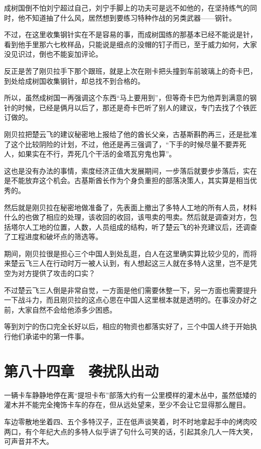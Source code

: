 成树国倒不怕刘宁超过自己，刘宁手脚上的功夫可是远不如他的，在坚持练气的同时，他不知道抽了什么风，居然想到要练习特种作战的另类武器——钢针。

不过，在这里收集钢针实在不是容易的事，而成树国练的那基本已经不能说是针，看到他手里那六七枚样品，只能说是细点的没帽的钉子而已，至于威力如何，大家没见识过，倒也不能妄加评论。

反正是苦了刚贝拉手下那个跟班，就是上次在刚卡把头撞到车前玻璃上的奇卡巴，到处给成树国收集钢针，却总找不到合格的。

所以，虽然成树国一再强调这个东西“马上要用到”，但等奇卡巴为他弄到满意的钢针的时候，已经是俩月以后了，那还是奇卡巴听了别人的建议，专门去找了个铁匠订做的。

刚贝拉把楚云飞的建议秘密地上报给了他的酋长父亲，古基斯斟酌再三，还是批准了这个比较阴险的计划，不过，他还是再三强调了，“下手的时候尽量不要弄死人，如果实在不行，弄死几个干活的金塔瓦穷鬼也算”。

这也是没有办法的事情，索度经济正值大发展期间，一步落后就要步步落后，实在是不能放弃这个机会。古基斯酋长作为个身负重担的部落决策人，其实算是相当优秀的。

然后就是刚贝拉在秘密地做准备了，先表面上撤出了多特人工地的所有人员，材料什么的也做了相应的处理，该收回的收回，该甩卖的甩卖。然后就是调查对方，包括塔尔人工地的位置，人数，人员组成的结构，听了楚云飞的补充建议后，还调查了工程进度和破坏点的筛选等。

期间，刚贝拉很是担心三个中国人到处乱逛，白人在这里确实算比较少见的，而将来楚云飞三人在行动时万一被人认到，有人想起这三人就在多特人这里，岂不是凭空为对方提供了攻击的口实？

不过楚云飞三人倒是非常自觉，一方面是他们需要休整一下，另一方面也需要提升一下战斗力，而且刚贝拉的这点心思在中国人这里根本就是透明的。在事没办好之前，大家自然不会给他添多少困惑。

等到刘宁的伤口完全长好以后，相应的物资也都落实好了，三个中国人终于开始执行他们承诺中的第一件事。

\section{第八十四章　袭扰队出动}

一辆卡车静静地停在离“提坦卡布”部落大约有一公里模样的灌木丛中，虽然低矮的灌木并不能完全掩饰卡车的存在，但从远处望来，至少不会让它显得那么醒目。

车边零散地坐着四、五个多特汉子，正在低声谈笑着，时不时地拿起手中的烤肉咬两口，有个年纪大点的多特人似乎讲了句什么可笑的话，引起其余几人一阵大笑，可声音并不大。

